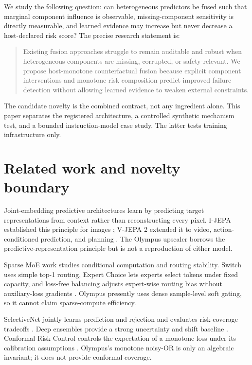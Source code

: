 \documentclass[10pt]{article}
\begin{document}
We study the following question: can heterogeneous predictors be fused such that marginal
component influence is observable, missing-component sensitivity is directly measurable,
and learned evidence may increase but never decrease a host-declared risk score? The
precise research statement is:

\begin{quote}
Existing fusion approaches struggle to remain auditable and robust when heterogeneous
components are missing, corrupted, or safety-relevant. We propose host-monotone
counterfactual fusion because explicit component interventions and monotone risk
composition predict improved failure detection without allowing learned evidence to
weaken external constraints.
\end{quote}

The candidate novelty is the combined contract, not any ingredient alone. This paper
separates the registered architecture, a controlled synthetic mechanism test, and a
bounded instruction-model case study. The latter tests training infrastructure only.

\section{Related work and novelty boundary}
Joint-embedding predictive architectures learn by predicting target representations from
context rather than reconstructing every pixel. I-JEPA established this principle for
images \cite{assran2023ijepa}; V-JEPA 2 extended it to video, action-conditioned prediction,
and planning \cite{assran2025vjepa2}. The Olympus upscaler borrows the predictive-representation
principle but is not a reproduction of either model.

Sparse MoE work studies conditional computation and routing stability. Switch uses simple
top-1 routing, Expert Choice lets experts select tokens under fixed capacity, and
loss-free balancing adjusts expert-wise routing bias without auxiliary-loss gradients
\cite{fedus2021switch,zhou2022expertchoice,wang2024lossfree}. Olympus presently uses dense
sample-level soft gating, so it cannot claim sparse-compute efficiency.

SelectiveNet jointly learns prediction and rejection and evaluates risk-coverage
tradeoffs \cite{geifman2019selectivenet}. Deep ensembles provide a strong uncertainty and
shift baseline \cite{lakshminarayanan2016ensembles}. Conformal Risk Control controls the
expectation of a monotone loss under its calibration assumptions
\cite{angelopoulos2022crc}. Olympus's monotone noisy-OR is only an algebraic invariant; it
does not provide conformal coverage.
\end{document}
